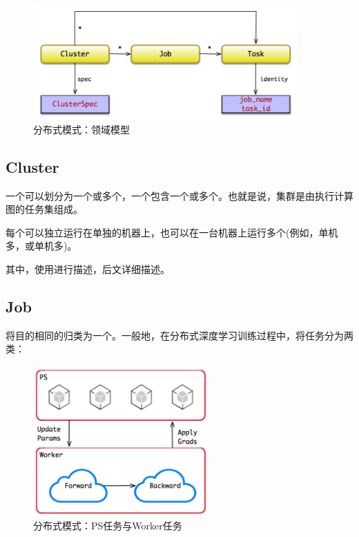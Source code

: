 \begin{content}

\begin{figure}[!h]
\centering
\includegraphics[width=0.9\textwidth]{figures/cc-dist-model.png}
\caption{分布式模式：领域模型}
 \label{fig:cc-dist-model}
\end{figure}

\subsection{Cluster}

一个可以划分为一个或多个，一个包含一个或多个。也就是说，集群是由执行计算图的任务集组成。

每个可以独立运行在单独的机器上，也可以在一台机器上运行多个(例如，单机多，或单机多)。

其中，使用进行描述，后文详细描述。

\subsection{Job}

将目的相同的归类为一个。一般地，在分布式深度学习训练过程中，将任务分为两类：

\begin{enum}
\end{enum}

\begin{figure}[!h]
\centering
\includegraphics[width=0.6\textwidth]{figures/py-dist-ps-worker.png}
\caption{分布式模式：PS任务与Worker任务}
 \label{fig:py-dist-ps-worker}
\end{figure}


\end{content}
